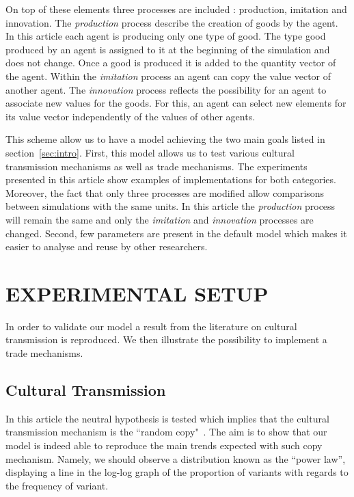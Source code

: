 \documentclass{wscpaperproc}
\begin{document}
On top of these elements three processes are included : production, imitation and innovation. The \textit{production} process describe the creation of goods by the agent. In this article each agent is producing only one type of good. The type good produced by an agent is assigned to it at the beginning of the simulation and does not change. Once a good is produced it is added to the quantity vector of the agent. Within the \textit{imitation} process an agent can copy the value vector of another agent. The \textit{innovation} process reflects the possibility for an agent to associate new values for the goods. For this, an agent can select new elements for its value vector independently of the values of other agents. 

This scheme allow us to have a model achieving the two main goals listed in section~\ref{sec:intro}. First, this model allows us to test various cultural transmission mechanisms as well as trade mechanisms. The experiments presented in this article show examples of implementations for both categories. Moreover, the fact that only three processes are modified allow comparisons between simulations with the same units. In this article the \textit{production} process will remain the same and only the \textit{imitation} and \textit{innovation} processes are changed. Second, few parameters are present in the default model which makes it easier to analyse and reuse by other researchers.


\section{EXPERIMENTAL SETUP}


In order to validate our model a result from the literature on cultural transmission is reproduced. We then illustrate the possibility to implement a trade mechanisms. 

\subsection{Cultural Transmission}

In this article the neutral hypothesis is tested which implies that the cultural transmission mechanism is the ``random copy"~\cite{bentley_random_2004,bentley_specialisation_2005,mesoudi_random_2009}. The aim is to show that our model is indeed able to reproduce the main trends expected with such copy mechanism. Namely, we should observe a distribution known as the ``power law'', displaying a line in the log-log graph of the proportion of variants with regards to the frequency of variant.
\end{document}
